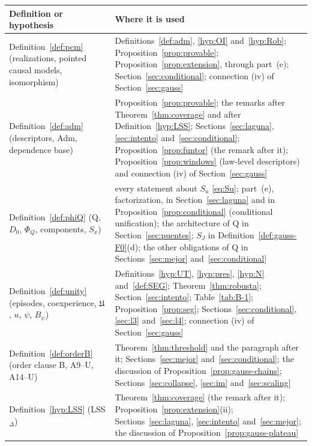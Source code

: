 \begin{table}[htbp]\centering\small
\begin{tabular}{>{\raggedright\arraybackslash}p{}>{\raggedright\arraybackslash}p{}}
\toprule
Definition or hypothesis & Where it is used\\
\midrule
Definition~\ref{def:pcm} (realizations, pointed causal models, isomorphism) & Definitions~\ref{def:adm}, \ref{hyp:OI} and~\ref{hyp:Rob}; Proposition~\ref{prop:provable}; Proposition~\ref{prop:extension}, through part~(e); Section~\ref{sec:conditional}; connection (iv) of Section~\ref{sec:gauss}\\
Definition~\ref{def:adm} (descriptors, Adm, dependence base) & Proposition~\ref{prop:provable}; the remarks after Theorem~\ref{thm:coverage} and after Definition~\ref{hyp:LSS}; Sections~\ref{sec:laguna}, \ref{sec:intento} and~\ref{sec:conditional}; Proposition~\ref{prop:funtor} (the remark after it); Proposition~\ref{prop:windows} (law-level descriptors) and connection (iv) of Section~\ref{sec:gauss}\\
Definition~\ref{def:phiQ} (Q, $D_0$, $\Phi_Q$, components, $S_x$) & every statement about $S_u$ \eqref{eq:Su}; part~(e), factorization, in Section~\ref{sec:laguna} and in Proposition~\ref{prop:conditional} (conditional unification); the architecture of Q in Section~\ref{sec:puentes}; $S_J$ in Definition~\ref{def:gauss-F0}(d); the other obligations of Q in Sections~\ref{sec:mejor} and~\ref{sec:conditional}\\
Definition~\ref{def:unity} (episodes, coexperience, $\mathfrak U$, $u$, $\psi$, $B_\psi$) & Definitions~\ref{hyp:UT}, \ref{hyp:pres}, \ref{hyp:N} and~\ref{def:SEG}; Theorem~\ref{thm:robusta}; Section~\ref{sec:intento}; Table~\ref{tab:B-1}; Proposition~\ref{prop:seg}; Sections~\ref{sec:conditional}, \ref{sec:l3} and~\ref{sec:l4}; connection (iv) of Section~\ref{sec:gauss}\\
Definition~\ref{def:orderB} (order clause B, A9--U, A14--U) & Theorem~\ref{thm:threshold} and the paragraph after it; Sections~\ref{sec:mejor} and~\ref{sec:conditional}; the discussion of Proposition~\ref{prop:gauss-chains}; Sections~\ref{sec:collapse}, \ref{sec:im} and~\ref{sec:scaling}\\
Definition~\ref{hyp:LSS} (LSS$_\Delta$) & Theorem~\ref{thm:coverage} (the remark after it); Proposition~\ref{prop:extension}(ii); Sections~\ref{sec:laguna}, \ref{sec:intento} and~\ref{sec:mejor}; the discussion of Proposition~\ref{prop:gauss-plateau}\\

\end{tabular}
\end{table}
